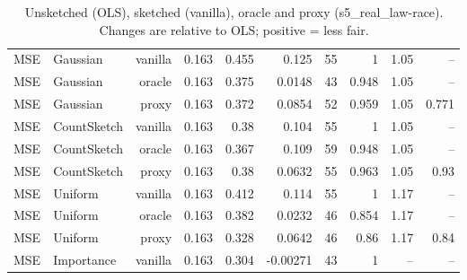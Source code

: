 \begin{table}[t]
\begin{tabular}{llrrrrrrrr}
\midrule
MSE & Gaussian & vanilla & 0.163 & 0.455 & 0.125 & 55 & 1 & 1.05 & -- \\
MSE & Gaussian & oracle & 0.163 & 0.375 & 0.0148 & 43 & 0.948 & 1.05 & -- \\
MSE & Gaussian & proxy & 0.163 & 0.372 & 0.0854 & 52 & 0.959 & 1.05 & 0.771 \\
MSE & CountSketch & vanilla & 0.163 & 0.38 & 0.104 & 55 & 1 & 1.05 & -- \\
MSE & CountSketch & oracle & 0.163 & 0.367 & 0.109 & 59 & 0.948 & 1.05 & -- \\
MSE & CountSketch & proxy & 0.163 & 0.38 & 0.0632 & 55 & 0.963 & 1.05 & 0.93 \\
MSE & Uniform & vanilla & 0.163 & 0.412 & 0.114 & 55 & 1 & 1.17 & -- \\
MSE & Uniform & oracle & 0.163 & 0.382 & 0.0232 & 46 & 0.854 & 1.17 & -- \\
MSE & Uniform & proxy & 0.163 & 0.328 & 0.0642 & 46 & 0.86 & 1.17 & 0.84 \\
MSE & Importance & vanilla & 0.163 & 0.304 & -0.00271 & 43 & 1 & -- & -- \\
\bottomrule
\end{tabular}
\caption{Unsketched (OLS), sketched (vanilla), oracle and proxy (s5_real_law-race). Changes are relative to OLS; positive = less fair.}
\label{tab:strat_s5_real_law-race}
\end{table}